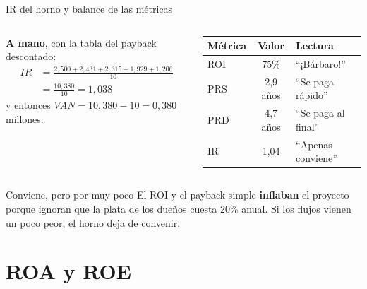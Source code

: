 \documentclass[aspectratio=169,10pt]{beamer}
\begin{document}
\begin{frame}{IR del horno y balance de las métricas}

\begin{columns}[T]
\textbf{A mano}, con la tabla del payback descontado:
\[
\begin{aligned}
IR &= \frac{2{,}500 + 2{,}431 + 2{,}315 + 1{,}929 + 1{,}206}{10} \\[2pt]
   &= \frac{10{,}380}{10} = 1{,}038
\end{aligned}
\]
y entonces $VAN = 10{,}380 - 10 = 0{,}380$ millones.

\begin{center}
\begin{tabular}{lcl}
\toprule
\textbf{Métrica} & \textbf{Valor} & \textbf{Lectura} \\
\midrule
ROI         & 75\%      & ``¡Bárbaro!'' \\
PRS         & 2,9 años  & ``Se paga rápido'' \\
PRD         & 4,7 años  & ``Se paga al final'' \\
IR          & 1,04      & ``Apenas conviene'' \\
\bottomrule
\end{tabular}
\end{center}
\end{columns}

\vspace{0.3cm}
\begin{alertblock}{Conviene, pero por muy poco}
El ROI y el payback simple \textbf{inflaban} el proyecto porque ignoran que la plata de los dueños
cuesta 20\% anual. Si los flujos vienen un poco peor, el horno deja de convenir.
\end{alertblock}
\end{frame}

\section{ROA y ROE}
\end{document}
